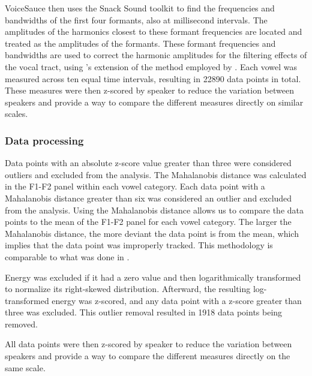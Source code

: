 VoiceSauce then uses the Snack Sound toolkit \citep{sjolanderSnackSoundToolkit2004} to find the frequencies and bandwidths of the first four formants, also at millisecond intervals. The amplitudes of the harmonics closest to these formant frequencies are located and treated as the amplitudes of the formants. These formant frequencies and bandwidths are used to correct the harmonic amplitudes for the filtering effects of the vocal tract, using \citeauthor{iseliAgeSexVowel2007}'s \citeyear{iseliAgeSexVowel2007} extension of the method employed by \citet{hansonGlottalCharacteristicsFemale1997}. Each vowel was measured across ten equal time intervals, resulting in 22890 data points in total. These measures were then z-scored by speaker to reduce the variation between speakers and provide a way to compare the different measures directly on similar scales.

\subsubsection{Data processing} \label{sec:data_processing}
Data points with an absolute z-score value greater than three were considered outliers and excluded from the analysis. The Mahalanobis distance was calculated in the F1-F2 panel within each vowel category. Each data point with a Mahalanobis distance greater than six was considered an outlier and excluded from the analysis. Using the Mahalanobis distance allows us to compare the data points to the mean of the F1-F2 panel for each vowel category. The larger the Mahalanobis distance, the more deviant the data point is from the mean, which implies that the data point was improperly tracked. This methodology is comparable to what was done in \citet{seyfarthPlosiveVoicingAcoustics2018,chaiCheckedSyllablesChecked2022,garellekPhoneticsWhiteHmong2023}.

Energy was excluded if it had a zero value and then logarithmically transformed to normalize its right-skewed distribution. Afterward, the resulting log-transformed energy was z-scored, and any data point with a z-score greater than three was excluded. This outlier removal resulted in 1918 data points being removed. 

All data points were then z-scored by speaker to reduce the variation between speakers and provide a way to compare the different measures directly on the same scale.

